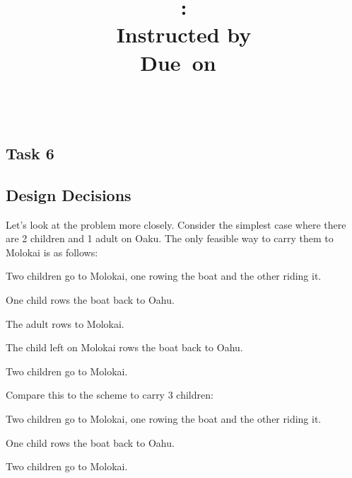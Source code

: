 \documentclass{article}
\title{\textmd{\bf \Class: \Title}\\{\large Instructed by \textit{\ClassInstructor}}\\\normalsize\vspace{0.1in}\small{Due\ on\ \DueDate}}
\date{}
\author{\textbf{\StudentName}\ \ \StudentClass\ \ \StudentNumber}
\begin{document}
\begin{spacing}{1.1}
\maketitle \thispagestyle{empty}



\theoremstyle{plain} \newtheorem{computational}{Definition}

\section{Task 6}

\subsection{Design Decisions}
Let's look at the problem more closely. Consider the simplest case where there are 2 children and 1 adult on Oaku. The only feasible way to carry them to Molokai is as follows:
\begin{asparaitem}
  \item Two children go to Molokai, one rowing the boat and the other riding it.\\
  \item One child rows the boat back to Oahu.\\
  \item The adult rows to Molokai.\\
  \item The child left on Molokai rows the boat back to Oahu.\\
  \item Two children go to Molokai.\\
\end{asparaitem}

Compare this to the scheme to carry 3 children:
\begin{asparaitem}
  \item Two children go to Molokai, one rowing the boat and the other riding it.\\
  \item One child rows the boat back to Oahu.\\
  \item Two children go to Molokai.\\
\end{asparaitem}


\end{spacing}
\end{document}

